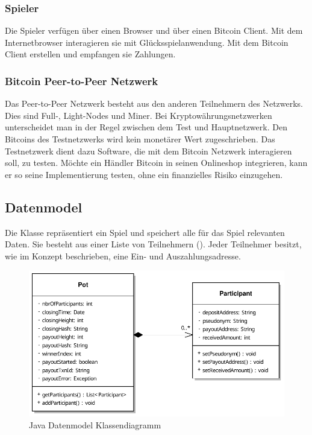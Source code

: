 \subsubsection{Spieler}
Die Spieler verfügen über einen Browser und über einen Bitcoin Client.
Mit dem Internetbrowser interagieren sie mit Glücksspielanwendung. Mit dem Bitcoin Client erstellen und empfangen sie Zahlungen.
\subsubsection{Bitcoin Peer-to-Peer Netzwerk}
Das Peer-to-Peer Netzwerk besteht aus den anderen Teilnehmern des Netzwerks. Dies sind Full-, Light-Nodes und Miner. Bei Kryptowährungsnetzwerken unterscheidet man in der Regel zwischen dem Test und Hauptnetzwerk. Den Bitcoins des Testnetzwerks wird kein monetärer Wert zugeschrieben. Das Testnetzwerk dient dazu Software, die mit dem Bitcoin Netzwerk interagieren soll, zu testen. Möchte ein Händler Bitcoin in seinen Onlineshop integrieren, kann er so seine Implementierung testen, ohne ein finanzielles Risiko einzugehen. 

\subsection{Datenmodel}
Die Klasse  repräsentiert ein Spiel und speichert alle für das Spiel relevanten Daten. Sie besteht aus einer Liste von Teilnehmern (). Jeder Teilnehmer besitzt, wie im Konzept beschrieben, eine Ein- und Auszahlungsadresse.
\begin{figure}[H]
\centering
\includegraphics[width=1\linewidth]{Figures/umsetzung_btc/btc_datamodel}
\decoRule
\caption{Java Datenmodel Klassendiagramm}
\label{fig:btc_datenmodell}
\end{figure}

